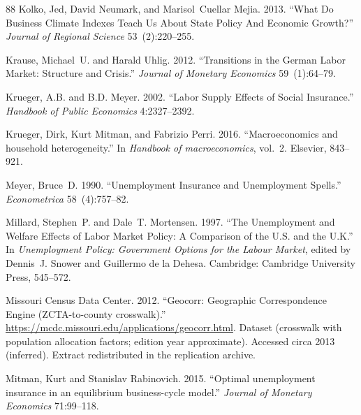 \documentclass[12pt]{article}
\newcommand{\1}{\mathbf{1}}
\begin{document}
\begin{thebibliography}{88}
Kolko, Jed, David Neumark, and Marisol~Cuellar Mejia. 2013.
\newblock \enquote{What Do Business Climate Indexes Teach Us About State Policy And Economic Growth?}
\newblock \emph{Journal of Regional Science} 53~(2):220--255.

Krause, Michael~U. and Harald Uhlig. 2012.
\newblock \enquote{Transitions in the German Labor Market: Structure and Crisis.}
\newblock \emph{Journal of Monetary Economics} 59~(1):64--79.

Krueger, A.B. and B.D. Meyer. 2002.
\newblock \enquote{Labor Supply Effects of Social Insurance.}
\newblock \emph{Handbook of Public Economics} 4:2327--2392.

Krueger, Dirk, Kurt Mitman, and Fabrizio Perri. 2016.
\newblock \enquote{Macroeconomics and household heterogeneity.}
\newblock In \emph{Handbook of macroeconomics}, vol.~2. Elsevier, 843--921.

Meyer, Bruce~D. 1990.
\newblock \enquote{Unemployment Insurance and Unemployment Spells.}
\newblock \emph{Econometrica} 58~(4):757--82.

Millard, Stephen~P. and Dale~T. Mortensen. 1997.
\newblock \enquote{The Unemployment and Welfare Effects of Labor Market Policy: A Comparison of the U.S. and the U.K.}
\newblock In \emph{Unemployment Policy: Government Options for the Labour Market}, edited by Dennis~J. Snower and Guillermo {de la Dehesa}. Cambridge: Cambridge University Press, 545--572.

{Missouri Census Data Center}. 2012.
\newblock \enquote{Geocorr: Geographic Correspondence Engine ({ZCTA}-to-county crosswalk).}
\newblock \urlprefix\url{https://mcdc.missouri.edu/applications/geocorr.html}.
\newblock Dataset (crosswalk with population allocation factors; edition year approximate). Accessed circa 2013 (inferred). Extract redistributed in the replication archive.

Mitman, Kurt and Stanislav Rabinovich. 2015.
\newblock \enquote{Optimal unemployment insurance in an equilibrium business-cycle model.}
\newblock \emph{Journal of Monetary Economics} 71:99--118.


\end{thebibliography}
\end{document}
